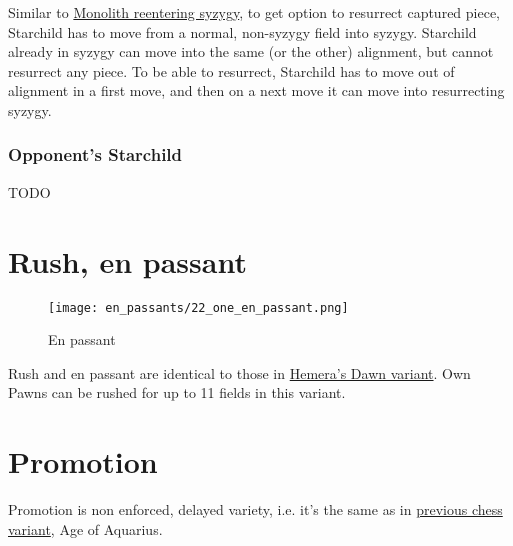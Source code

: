 Similar to \hyperref[fig:scn_d_21_syzygy_reentering_same_move]{Monolith reentering syzygy},
to get option to resurrect captured piece, Starchild has to move from a normal, non-syzygy
field into syzygy. Starchild already in syzygy can move into the same (or the other) alignment,
but cannot resurrect any piece. To be able to resurrect, Starchild has to move out of alignment
in a first move, and then on a next move it can move into resurrecting syzygy.

\clearpage %

\subsubsection*{Opponent's Starchild}

\huge{}
TODO
\normalsize{}

\clearpage %

\section*{Rush, en passant}

\vspace*{-1.2\baselineskip}
\noindent
\begin{figure}[!h]
\texttt{[image: en\_passants/22\_one\_en\_passant.png]}
\caption{En passant}
\label{fig:22_one_en_passant}
\end{figure}

Rush and en passant are identical to those in \hyperref[fig:14_hemera_s_dawn_en_passant]{Hemera's Dawn variant}.
Own Pawns can be rushed for up to 11 fields in this variant.

\clearpage %

\section*{Promotion}
\label{sec:One/Promotion}

Promotion is non enforced, delayed variety, i.e. it's the same as in
\hyperref[sec:Age of Aquarius/Promotion]{previous chess variant}, Age of Aquarius.

